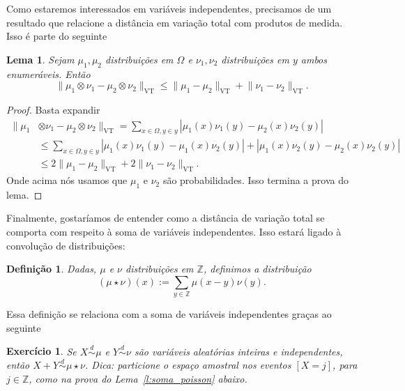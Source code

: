 \documentclass[reqno, final]{book}
\newcommand*\1{\mathds{1}}
\newtheorem{lemma}[theorem]{Lema}
\newtheorem{definition}[theorem]{Definição}
\newtheorem{exercise}[example]{Exercício}
\DeclareMathOperator{\VT}{VT}
\begin{document}
Como estaremos interessados em variáveis independentes, precisamos de um resultado que relacione a distância em variação total com produtos de medida. Isso é parte do seguinte

\begin{lemma}
\label{l:vt_produto}
Sejam $\mu_1, \mu_2$ distribuições em $\Omega$ e $\nu_1, \nu_2$ distribuições em $y$ ambos enumeráveis. Então
\begin{equation}
  \lVert \mu_1 \otimes \nu_1 - \mu_2 \otimes \nu_2 \rVert_{\VT} \leq \lVert \mu_1 - \mu_2 \rVert_{\VT} + \lVert \nu_1 - \nu_2 \rVert_{\VT}.
\end{equation}
\end{lemma}

\begin{proof}
Basta expandir
\begin{equation}
  \begin{split}
    \lVert \mu_1 & \otimes \nu_1 - \mu_2 \otimes \nu_2 \rVert_{\VT} = \sum_{x \in \Omega, y \in y} |\mu_1(x)\nu_1(y) - \mu_2(x)\nu_2(y)|\\
    & \leq \sum_{x \in \Omega, y \in y} |\mu_1(x)\nu_1(y) - \mu_1(x)\nu_2(y)| + |\mu_1(x)\nu_2(y) - \mu_2(x)\nu_2(y)|\\
    & \leq 2\lVert \mu_1 - \mu_2 \rVert_{\VT} + 2\lVert \nu_1 - \nu_2 \rVert_{\VT}.
  \end{split}
\end{equation}
Onde acima nós usamos que $\mu_1$ e $\nu_2$ são probabilidades. Isso termina a prova do lema.
\end{proof}

Finalmente, gostaríamos de entender como a distância de variação total se comporta com respeito à soma de variáveis independentes.
Isso estará ligado à convolução de distribuições:

\begin{definition}
Dadas, $\mu$ e $\nu$ distribuições em $\mathbb{Z}$, definimos a distribuição
\begin{equation}
  (\mu \star \nu)(x) := \sum_{y \in \mathbb{Z}} \mu(x-y) \nu(y).
\end{equation}
\end{definition}

Essa definição se relaciona com a soma de variáveis independentes graças ao seguinte
\begin{exercise}
Se $X \overset{d}\sim \mu$ e $Y \overset{d}\sim \nu$ são variáveis aleatórias inteiras e independentes, então $X + Y \overset{d}\sim \mu \star \nu$.
Dica: particione o espaço amostral nos eventos $[X = j]$, para $j \in \mathbb{Z}$, como na prova do Lema~\ref{l:soma_poisson} abaixo.
\end{exercise}
\end{document}
